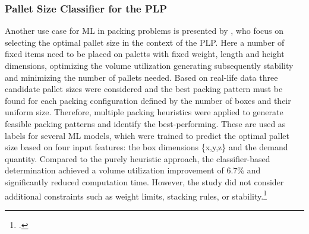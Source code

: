 \subsubsection{Pallet Size Classifier for the \gls{PLP}}
Another use case for \gls{ML} in packing problems is presented by \citeauthor*{aylak_application_2021},
who focus on selecting the optimal pallet size in the context of the \gls{PLP}. Here a number of fixed items
need to be placed on paletts with fixed weight, length and height dimensions, optimizing the volume utilization
generating subsequently stability and minimizing the number of pallets needed. Based on real-life data
three candidate pallet sizes were considered and the best packing pattern must be found for each packing
configuration defined by the number of boxes and their uniform size. Therefore, multiple packing heuristics were applied to
generate feasible packing patterns and identify the best-performing. These are used as labels for several
\gls{ML} models, which were trained to predict the optimal pallet size based on four input features: the box
dimensions \{x,y,z\} and the demand quantity. Compared to the purely heuristic approach, the classifier-based
determination achieved a volume utilization improvement of $6.7\%$ and significantly reduced computation time.
However, the study did not consider additional constraints such as weight limits, stacking rules, or stability.\footcite[cf.][pp. 12--14]{aylak_application_2021}

\parbreak

